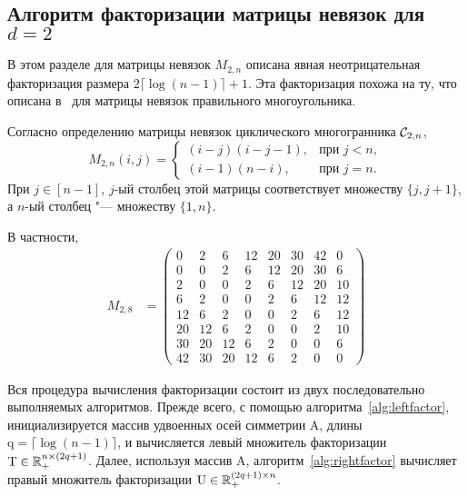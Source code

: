 %
%


\subsection{Алгоритм факторизации матрицы невязок для $d=2$}

В этом разделе для матрицы невязок $M_{2,n}$ описана явная неотрицательная факторизация размера $2\lceil\log(n-1)\rceil + 1$. 
Эта факторизация похожа на ту, что описана в~\cite{Fiorini:2012polygons} для матрицы невязок правильного многоугольника.

Согласно определению матрицы невязок циклического многогранника ${\mathcal C}_{2,n}$,
\[
M_{2,n}(i,j) = 
\begin{cases}
(i-j)(i-j-1), & \text{при } j < n,\\
(i-1)(n-i), & \text{при } j = n.
\end{cases}
\]
При $j \in [n-1]$, $j$-ый столбец этой матрицы соответствует множеству $\{j,j+1\}$, а $n$-ый столбец "--- множеству $\{1,n\}$.

В частности,
\begin{equation*}
\begin{split}
M_{2, 8} & =
\begin{pmatrix}
0	&  2	&  6	& 12	& 20	& 30	& 42	&  0 \\
0	&  0	&  2	&  6	& 12	& 20	& 30	&  6 \\
2	&  0	&  0	&  2	&  6	& 12	& 20	& 10 \\
6	&  2	&  0	&  0	&  2	&  6	& 12	& 12 \\
12	&  6	&  2	&  0	&  0	&  2	&  6	& 12 \\
20	& 12	&  6	&  2	&  0	&  0	&  2	& 10 \\
30	& 20	& 12	&  6	&  2	&  0	&  0	&  6 \\
42	& 30	& 20	& 12	&  6	&  2	&  0	&  0
\end{pmatrix}               
\end{split}
\end{equation*}

Вся процедура вычисления факторизации состоит из двух последовательно выполняемых алгоритмов.
Прежде всего, с помощью алгоритма~\ref{alg:leftfactor},
инициализируется массив удвоенных осей симметрии $\text{A}$, длины $\text{q} = \lceil\log(n-1)\rceil$, и вычисляется левый множитель факторизации $\text{T} \in \mathbb{R}_+^{n \times (2q+1)}$.
Далее, используя массив A, алгоритм~\ref{alg:rightfactor} вычисляет правый множитель факторизации $\text{U} \in \mathbb{R}_+^{(2q+1)\times n}$.

